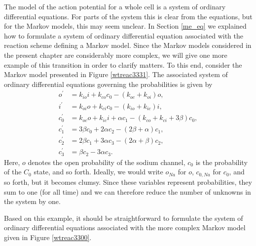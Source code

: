 The model of the action potential for a whole cell is a system of ordinary differential equations. For parts of the system this is clear from the equations,
but for the Markov models, this may seem unclear. In Section \ref{me_eq} we explained how to formulate a system of ordinary differential equation associated with the reaction scheme defining a Markov model.  Since the Markov models considered in the present chapter are considerably more complex, we will give one more example of this transition in order to clarify matters. To this end, consider the Markov model presented in Figure \ref{wtreac3331}.
 The associated system of ordinary differential equations governing the probabilities is given by
\begin{align*}
o^{\prime}  & =k_{io}i+k_{co}c_{0}-\left(  k_{oc}+k_{oi}\right)  o,\\
i^{\prime}  & =k_{oi}o+k_{ci}c_{0}-\left(  k_{io}+k_{ic}\right)  i,\\
c_{0}^{\prime}  & =k_{oc}o+k_{ic}i+\alpha c_{1}-\left(  k_{co}+k_{ci}
+3\beta\right)  c_{0},\\
c_{1}^{\prime}  & =3\beta c_{0}+2\alpha c_{2}-\left(  2\beta+\alpha\right)
c_{1},\\
c_{2}^{\prime}  & =2\beta c_{1}+3\alpha c_{3}-\left(  2\alpha+\beta\right)
c_{2},\\
c_{3}^{\prime}  & =\beta c_{2}-3\alpha c_{3}.
\end{align*}
Here, $o$ denotes the open probability of the sodium channel,  $c_0$ is the probability of the $C_0$ state, and so forth. Ideally, we would write $o_{Na}$ for $o$, $c_{0,Na}$ for $c_0$, and so forth, but it becomes clumsy. Since these variables represent probabilities, they sum to one (for all time) and we can therefore reduce the number of unknowns in the system by one.

Based on this example, it should be straightforward to formulate the system of ordinary differential equations associated with the more complex Markov model given in Figure \ref{wtreac3300}.

